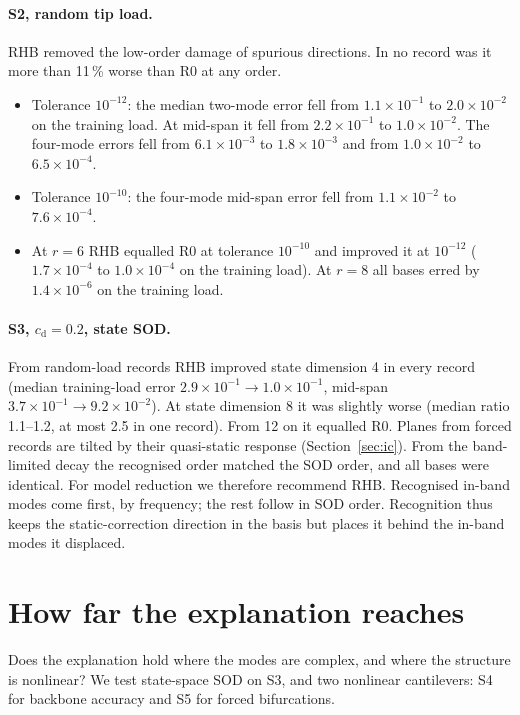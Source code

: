 \documentclass[preprint,12pt]{elsarticle}
\begin{document}
\paragraph{S2, random tip load.} RHB removed the low-order damage of spurious directions. In no record was it more than 11\,\% worse than R0 at any order.
\begin{itemize}
\item Tolerance $10^{-12}$: the median two-mode error fell from $1.1\times10^{-1}$ to $2.0\times10^{-2}$ on the training load. At mid-span it fell from $2.2\times10^{-1}$ to $1.0\times10^{-2}$. The four-mode errors fell from $6.1\times10^{-3}$ to $1.8\times10^{-3}$ and from $1.0\times10^{-2}$ to $6.5\times10^{-4}$.
\item Tolerance $10^{-10}$: the four-mode mid-span error fell from $1.1\times10^{-2}$ to $7.6\times10^{-4}$.
\item At $r=6$ RHB equalled R0 at tolerance $10^{-10}$ and improved it at $10^{-12}$ ($1.7\times10^{-4}$ to $1.0\times10^{-4}$ on the training load). At $r=8$ all bases erred by $1.4\times10^{-6}$ on the training load.
\end{itemize}
\paragraph{S3, $c_{\mathrm d}=0.2$, state SOD.} From random-load records RHB improved state dimension 4 in every record (median training-load error $2.9\times10^{-1}\to1.0\times10^{-1}$, mid-span $3.7\times10^{-1}\to9.2\times10^{-2}$). At state dimension 8 it was slightly worse (median ratio 1.1--1.2, at most 2.5 in one record). From 12 on it equalled R0. Planes from forced records are tilted by their quasi-static response (Section~\ref{sec:ic}). From the band-limited decay the recognised order matched the SOD order, and all bases were identical.
For model reduction we therefore recommend RHB. Recognised in-band modes come first, by frequency; the rest follow in SOD order.
Recognition thus keeps the static-correction direction in the basis but places it behind the in-band modes it displaced.


\section{How far the explanation reaches}\label{sec:reach}
Does the explanation hold where the modes are complex, and where the structure is nonlinear? We test state-space SOD on S3, and two nonlinear cantilevers: S4 for backbone accuracy and S5 for forced bifurcations.
\end{document}
